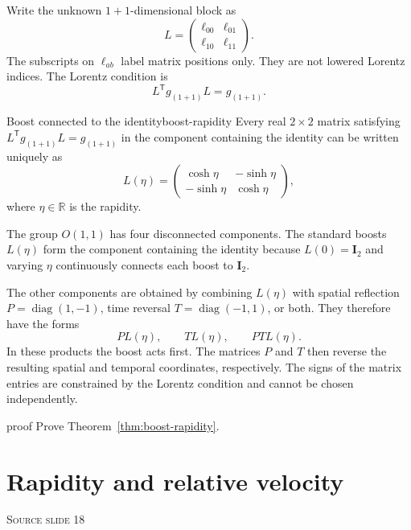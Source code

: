 \documentclass[11pt,a4paper]{article}
\newcommand{\R}{\mathbb{R}}
\newcommand{\id}{\mathbf{I}}
\newcommand{\transpose}{\mathsf{T}}
\newcommand{\slideref}[1]{%
  \par\smallskip
  {\footnotesize\color{ink!60}\textsc{Source slide #1}}\par
}
\begin{document}
Write the unknown \(1+1\)-dimensional block as
\[
  L=
  \begin{pmatrix}\ell_{00}&\ell_{01}\\\ell_{10}&\ell_{11}\end{pmatrix}.
\]
The subscripts on \(\ell_{ab}\) label matrix positions only. They are not
lowered Lorentz indices.
The Lorentz condition is
\[
  L^{\transpose}g_{(1+1)}L=g_{(1+1)}.
\]

\begin{theorem}{Boost connected to the identity}{boost-rapidity}
Every real \(2\times2\) matrix satisfying
\(L^{\transpose}g_{(1+1)}L=g_{(1+1)}\) in the component containing the
identity can be written uniquely as
\[
\boxed{
L(\eta)=
\begin{pmatrix}
  \cosh\eta&-\sinh\eta\\
  -\sinh\eta&\cosh\eta
\end{pmatrix},
}
\]
where \(\eta\in\R\) is the rapidity.
\end{theorem}

\begin{precision}
The group \(O(1,1)\) has four disconnected components. The standard boosts
\(L(\eta)\) form the component containing the identity because
\(L(0)=\id_2\) and varying \(\eta\) continuously connects each boost to
\(\id_2\).

The other components are obtained by combining \(L(\eta)\) with spatial
reflection \(P=\operatorname{diag}(1,-1)\), time reversal
\(T=\operatorname{diag}(-1,1)\), or both. They therefore have the forms
\[
  PL(\eta),\qquad TL(\eta),\qquad PTL(\eta).
\]
In these products the boost acts first. The matrices \(P\) and \(T\) then
reverse the resulting spatial and temporal coordinates, respectively.
The signs of the matrix entries are constrained by the Lorentz condition and
cannot be chosen independently.
\end{precision}

\begin{studentwork}[height=11.0cm]{proof}
Prove Theorem~\ref{thm:boost-rapidity}.
\end{studentwork}

\section{Rapidity and relative velocity}
\slideref{18}
\end{document}
